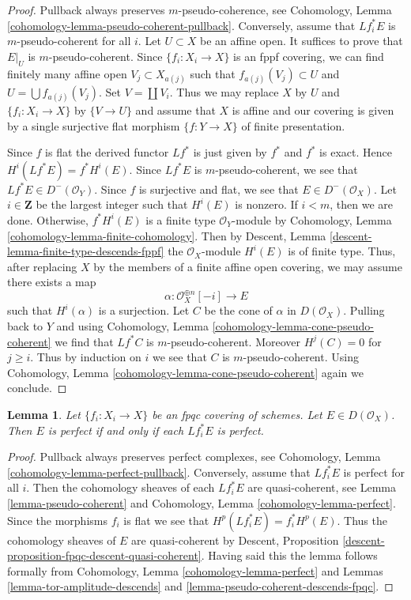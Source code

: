 \documentclass{stacks-project}
\theoremstyle{plain}
\newtheorem{lemma}[subsection]{Lemma}
\theoremstyle{definition}
\theoremstyle{remark}
\numberwithin{equation}{subsection}
\begin{document}
\begin{proof}
Pullback always preserves $m$-pseudo-coherence, see
Cohomology, Lemma \ref{cohomology-lemma-pseudo-coherent-pullback}.
Conversely, assume that $Lf_i^*E$ is $m$-pseudo-coherent for all $i$.
Let $U \subset X$ be an affine open. It suffices to prove that
$E|_U$ is $m$-pseudo-coherent. Since $\{f_i : X_i \to X\}$ is an
fppf covering, we can find finitely many affine open $V_j \subset X_{a(j)}$
such that $f_{a(j)}(V_j) \subset U$ and $U = \bigcup f_{a(j)}(V_j)$.
Set $V = \coprod V_i$.
Thus we may replace $X$ by $U$ and $\{f_i : X_i \to X\}$ by
$\{V \to U\}$ and assume that $X$ is affine and our covering
is given by a single surjective flat morphism $\{f : Y \to X\}$
of finite presentation.

\medskip\noindent
Since $f$ is flat the derived functor $Lf^*$ is just given by $f^*$ and $f^*$
is exact. Hence $H^i(Lf^*E) = f^*H^i(E)$. Since $Lf^*E$ is $m$-pseudo-coherent,
we see that $Lf^*E \in D^-(\mathcal{O}_Y)$. Since $f$ is surjective and flat,
we see that $E \in D^-(\mathcal{O}_X)$. Let $i \in \mathbf{Z}$ be the largest
integer such that $H^i(E)$ is nonzero. If $i < m$, then we are done. Otherwise,
$f^*H^i(E)$ is a finite type $\mathcal{O}_Y$-module by
Cohomology, Lemma \ref{cohomology-lemma-finite-cohomology}.
Then by Descent, Lemma \ref{descent-lemma-finite-type-descends-fppf}
the $\mathcal{O}_X$-module $H^i(E)$ is of finite type.
Thus, after replacing $X$ by the members of a finite affine open covering,
we may assume there exists a map
$$
\alpha : \mathcal{O}_X^{\oplus n}[-i] \longrightarrow E
$$
such that $H^i(\alpha)$ is a surjection. Let $C$ be the cone of $\alpha$
in $D(\mathcal{O}_X)$. Pulling back to $Y$ and using
Cohomology, Lemma \ref{cohomology-lemma-cone-pseudo-coherent}
we find that $Lf^*C$ is $m$-pseudo-coherent. Moreover $H^j(C) = 0$
for $j \geq i$. Thus by induction on $i$ we see that $C$ is
$m$-pseudo-coherent. Using
Cohomology, Lemma \ref{cohomology-lemma-cone-pseudo-coherent}
again we conclude.
\end{proof}

\begin{lemma}
\label{lemma-perfect-descends-fpqc}
Let $\{f_i : X_i \to X\}$ be an fpqc covering of schemes. Let
$E \in D(\mathcal{O}_X)$. Then $E$ is perfect
if and only if each $Lf_i^*E$ is perfect.
\end{lemma}

\begin{proof}
Pullback always preserves perfect complexes, see
Cohomology, Lemma \ref{cohomology-lemma-perfect-pullback}.
Conversely, assume that $Lf_i^*E$ is perfect for all $i$.
Then the cohomology sheaves of each $Lf_i^*E$ are quasi-coherent, see
Lemma \ref{lemma-pseudo-coherent}
and
Cohomology, Lemma \ref{cohomology-lemma-perfect}.
Since the morphisms $f_i$ is flat we see that $H^p(Lf_i^*E) = f_i^*H^p(E)$.
Thus the cohomology sheaves of $E$ are quasi-coherent by
Descent, Proposition \ref{descent-proposition-fpqc-descent-quasi-coherent}.
Having said this the lemma follows formally from
Cohomology, Lemma \ref{cohomology-lemma-perfect}
and
Lemmas \ref{lemma-tor-amplitude-descends} and
\ref{lemma-pseudo-coherent-descends-fpqc}.
\end{proof}
\end{document}
